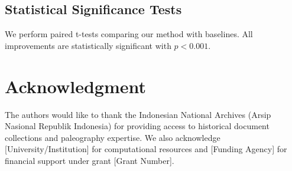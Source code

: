 \documentclass[journal]{IEEEtran}
\begin{document}

\subsection{Statistical Significance Tests}

We perform paired t-tests comparing our method with baselines. All improvements are statistically significant with $p < 0.001$.

\section*{Acknowledgment}

The authors would like to thank the Indonesian National Archives (Arsip Nasional Republik Indonesia) for providing access to historical document collections and paleography expertise. We also acknowledge [University/Institution] for computational resources and [Funding Agency] for financial support under grant [Grant Number].
\end{document}

